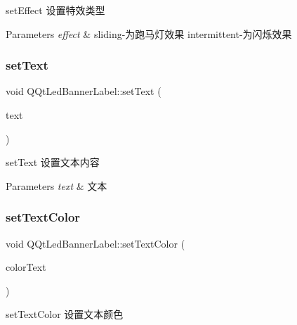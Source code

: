 set\+Effect 设置特效类型 


\begin{DoxyParams}{Parameters}
{\em effect} & sliding-\/为跑马灯效果 intermittent-\/为闪烁效果 \\
\hline
\end{DoxyParams}
\mbox{\label{class_q_qt_led_banner_label_ad3909e13933db40f461e3be0e89f70ea}} 
\subsubsection{\texorpdfstring{set\+Text}{setText}}
{\footnotesize\ttfamily void Q\+Qt\+Led\+Banner\+Label\+::set\+Text (\begin{DoxyParamCaption}\item[{Q\+String}]{text }\end{DoxyParamCaption})\hspace{0.3cm}{\ttfamily [slot]}}



set\+Text 设置文本内容 


\begin{DoxyParams}{Parameters}
{\em text} & 文本 \\
\hline
\end{DoxyParams}
\mbox{\label{class_q_qt_led_banner_label_a5d265f3a217fae856809426bb2bdefd1}} 
\subsubsection{\texorpdfstring{set\+Text\+Color}{setTextColor}}
{\footnotesize\ttfamily void Q\+Qt\+Led\+Banner\+Label\+::set\+Text\+Color (\begin{DoxyParamCaption}\item[{Q\+Color}]{color\+Text }\end{DoxyParamCaption})\hspace{0.3cm}{\ttfamily [slot]}}



set\+Text\+Color 设置文本颜色 


